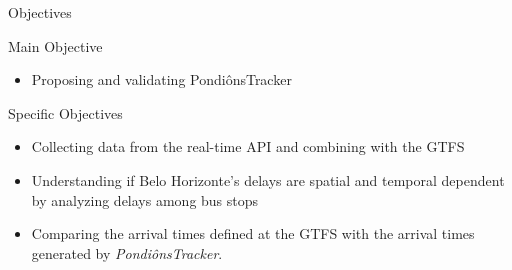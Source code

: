 \documentclass[xcolor=dvipsnames,table]{beamer}
\begin{document}
\begin{frame}{Objectives}
        \begin{block}{Main Objective}
                \begin{itemize}
                        \item Proposing and validating PondiônsTracker
                \end{itemize}
        \end{block}
        \begin{block}{Specific Objectives}
                \begin{itemize}
                        \item Collecting data from the real-time API and combining with the GTFS
                        \item Understanding if Belo Horizonte's delays are spatial and temporal dependent by analyzing delays among bus stops
                        \item Comparing the arrival times defined at the GTFS with the arrival times generated by \textit{PondiônsTracker}.
                \end{itemize}
        \end{block}
\end{frame}
\end{document}
